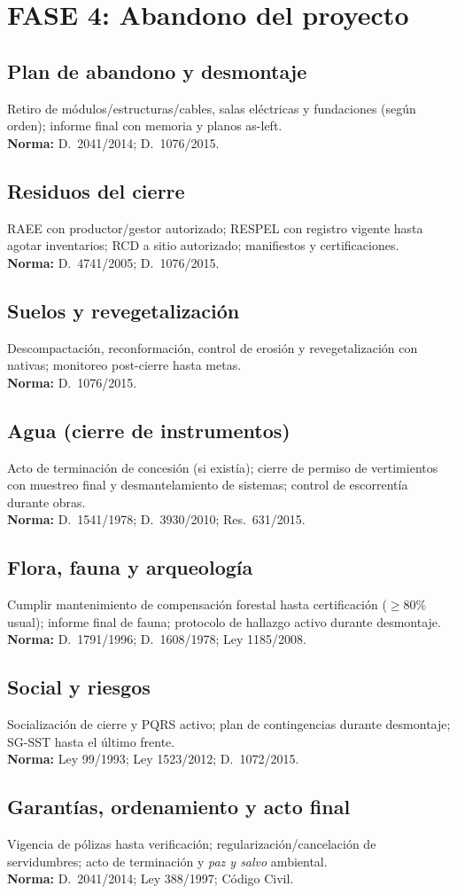 \section{FASE 4: Abandono del proyecto}
\subsection{Plan de abandono y desmontaje}
Retiro de módulos/estructuras/cables, salas eléctricas y fundaciones (según orden); informe final con memoria y planos as-left.\\
\textbf{Norma:} D.\ 2041/2014; D.\ 1076/2015.

\subsection{Residuos del cierre}
RAEE con productor/gestor autorizado; RESPEL con registro vigente hasta agotar inventarios; RCD a sitio autorizado; manifiestos y certificaciones.\\
\textbf{Norma:} D.\ 4741/2005; D.\ 1076/2015.

\subsection{Suelos y revegetalización}
Descompactación, reconformación, control de erosión y revegetalización con nativas; monitoreo post-cierre hasta metas.\\
\textbf{Norma:} D.\ 1076/2015.

\subsection{Agua (cierre de instrumentos)}
Acto de terminación de concesión (si existía); cierre de permiso de vertimientos con muestreo final y desmantelamiento de sistemas; control de escorrentía durante obras.\\
\textbf{Norma:} D.\ 1541/1978; D.\ 3930/2010; Res.\ 631/2015.

\subsection{Flora, fauna y arqueología}
Cumplir mantenimiento de compensación forestal hasta certificación ($\geq$80\% usual); informe final de fauna; protocolo de hallazgo activo durante desmontaje.\\
\textbf{Norma:} D.\ 1791/1996; D.\ 1608/1978; Ley 1185/2008.

\subsection{Social y riesgos}
Socialización de cierre y PQRS activo; plan de contingencias durante desmontaje; SG-SST hasta el último frente.\\
\textbf{Norma:} Ley 99/1993; Ley 1523/2012; D.\ 1072/2015.

\subsection{Garantías, ordenamiento y acto final}
Vigencia de pólizas hasta verificación; regularización/cancelación de servidumbres; acto de terminación y \textit{paz y salvo} ambiental. \\
\textbf{Norma:} D.\ 2041/2014; Ley 388/1997; Código Civil.

